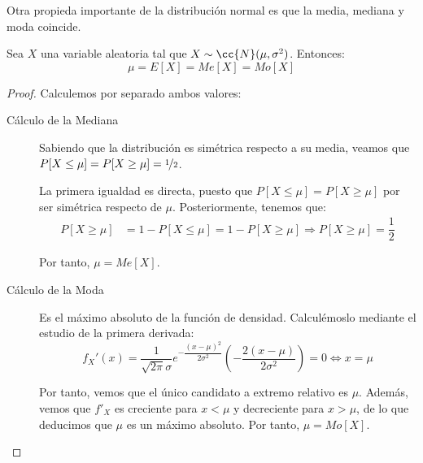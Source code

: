 Otra propieda importante de la distribución normal es que la media, mediana y moda coincide.
\begin{coro}
    Sea $X$ una variable aleatoria tal que $X\sim \cc{N}(\mu,\sigma^2)$. Entonces:
    \begin{equation*}
        \mu = E[X] = Me[X] = Mo[X]
    \end{equation*}
\end{coro}
\begin{proof}
    Calculemos por separado ambos valores:
    \begin{description}
        \item[Cálculo de la Mediana] Sabiendo que la distribución es simétrica respecto a su media, 
        veamos que $P[X\leq \mu] = P[X\geq \mu] = \nicefrac{1}{2}$.

        La primera igualdad es directa, puesto que $P[X\leq \mu] = P[X\geq \mu]$ por ser simétrica respecto de $\mu$.
        Posteriormente, tenemos que:
        \begin{align*}
            P[X\geq \mu] &= 1-P[X\leq \mu] = 1-P[X\geq \mu] \Longrightarrow P[X\geq \mu] = \dfrac{1}{2}
        \end{align*}

        Por tanto, $\mu=Me[X]$.

        \item[Cálculo de la Moda] Es el máximo absoluto de la función de densidad. Calculémoslo mediante el estudio de la primera derivada:
        \begin{equation*}
            f_X'(x) = \dfrac{1}{\sqrt{2\pi}\sigma} e^{-\dfrac{(x-\mu)^2}{2\sigma^2}} \left(-\dfrac{2(x-\mu)}{2\sigma^2}\right) = 0\Longleftrightarrow x=\mu
        \end{equation*}
        
        Por tanto, vemos que el único candidato a extremo relativo es $\mu$. Además, vemos que $f'_X$ es creciente para $x<\mu$ y decreciente para $x>\mu$,
        de lo que deducimos que $\mu$ es un máximo absoluto. Por tanto, $\mu = Mo[X]$.
        \qedhere
    \end{description}
\end{proof}

